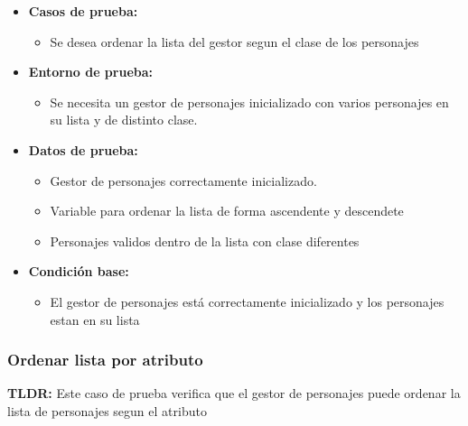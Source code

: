 \documentclass{article}
\begin{document}
\begin{itemize}
	\item \textbf{Casos de prueba:}
	\begin{itemize}
		\item Se desea ordenar la lista del gestor segun el clase de los personajes
	\end{itemize}
	
	\item \textbf{Entorno de prueba:}
	\begin{itemize}
		\item Se necesita un gestor de personajes inicializado con varios personajes en su lista y de distinto clase.
	\end{itemize}
	
	\item \textbf{Datos de prueba:}
	\begin{itemize}
		\item Gestor de personajes correctamente inicializado.
        \item Variable para ordenar la lista de forma ascendente y descendete
		\item Personajes validos dentro de la lista con clase diferentes
	\end{itemize}
	
	\item \textbf{Condición base:}
	\begin{itemize}
		\item El gestor de personajes está correctamente inicializado y los personajes estan en su lista
	\end{itemize}
	
\end{itemize}

\subsubsection{Ordenar lista por atributo}
\textbf{TLDR:} Este caso de prueba verifica que el gestor de personajes puede ordenar la lista de personajes segun el atributo 
\end{document}
